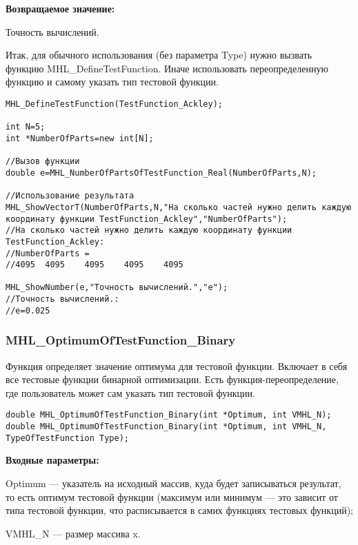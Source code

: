 \documentclass[a4paper,12pt]{article}
\begin{document}
\textbf{Возвращаемое значение:}
 
Точность вычислений.

Итак, для обычного использования (без параметра Type) нужно вызвать функцию MHL\_DefineTestFunction. Иначе использовать переопределенную функцию и самому указать тип тестовой функции.


\begin{lstlisting}[label=code_use_MHL_NumberOfPartsOfTestFunction_Real,caption=Пример использования]
MHL_DefineTestFunction(TestFunction_Ackley);

int N=5;
int *NumberOfParts=new int[N];

//Вызов функции
double e=MHL_NumberOfPartsOfTestFunction_Real(NumberOfParts,N);

//Использование результата
MHL_ShowVectorT(NumberOfParts,N,"На сколько частей нужно делить каждую координату функции TestFunction_Ackley","NumberOfParts");
//На сколько частей нужно делить каждую координату функции TestFunction_Ackley:
//NumberOfParts =	
//4095	4095	4095	4095	4095

MHL_ShowNumber(e,"Точность вычислений.","e");
//Точность вычислений.:
//e=0.025
\end{lstlisting}

\subsubsection{MHL\_OptimumOfTestFunction\_Binary}\label{MHL_OptimumOfTestFunction_Binary}

Функция определяет значение оптимума для тестовой функции. Включает в себя все тестовые функции бинарной оптимизации. Есть функция-переопределение, где пользователь может сам указать тип тестовой функции.


\begin{lstlisting}[label=code_syntax_MHL_OptimumOfTestFunction_Binary,caption=Синтаксис]
double MHL_OptimumOfTestFunction_Binary(int *Optimum, int VMHL_N);
double MHL_OptimumOfTestFunction_Binary(int *Optimum, int VMHL_N, TypeOfTestFunction Type);
\end{lstlisting}

\textbf{Входные параметры:}

Optimum --- указатель на исходный массив, куда будет записываться результат, то есть оптимум тестовой функции (максимум или минимум --- это зависит от типа тестовой функции, что расписывается в самих функциях тестовых функций);

     VMHL\_N --- размер массива x.
\end{document}
